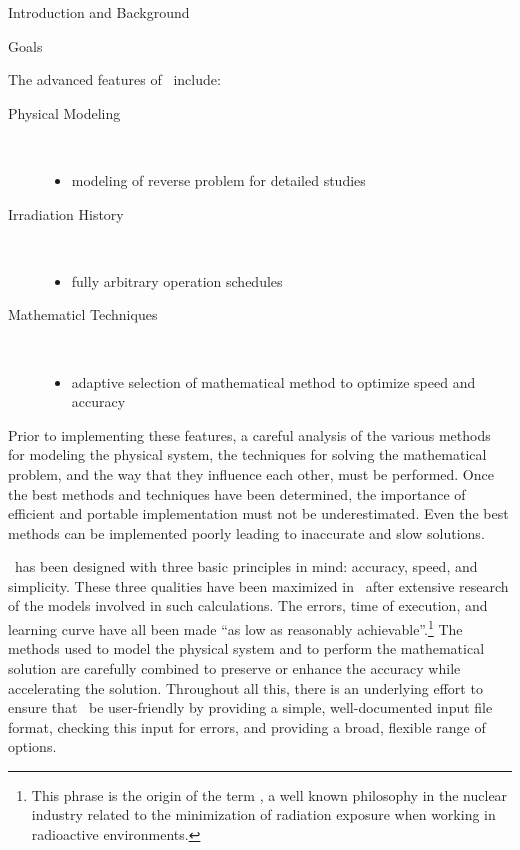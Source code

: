 \begin{chapter}{Introduction and Background}
\begin{section}{Goals}
    \vspace*{1cm}

    The advanced features of \ALARA\ include:
    \begin{description}
    \item[Physical Modeling]\ \\
      \vspace*{-1cm}
      \begin{itemize}
      \item modeling of reverse problem for detailed studies
      \end{itemize}
    \item[Irradiation History]\ \\
      \vspace*{-1cm}
      \begin{itemize}
      \item fully arbitrary operation schedules
      \end{itemize}
    \item[Mathematicl Techniques]\ \\
      \vspace*{-1cm}
      \begin{itemize}
      \item adaptive selection of mathematical method to optimize
        speed and accuracy
      \end{itemize}
    \end{description}
    
    
    Prior to implementing these features, a careful analysis of the
    various methods for modeling the physical system, the techniques
    for solving the mathematical problem, and the way that they
    influence each other, must be performed.  Once the best methods and
    techniques have been determined, the importance of efficient and
    portable implementation must not be underestimated.  Even the best
    methods can be implemented poorly leading to inaccurate and slow
    solutions.
    
    \ALARA\ has been designed with three basic principles in mind:
    accuracy, speed, and simplicity.  These three qualities have been
    maximized in \ALARA\ after extensive research of the models
    involved in such calculations.  The errors, time of execution, and
    learning curve have all been made ``as low as reasonably
    achievable''.\footnote{This phrase is the origin of the term
      \ALARA, a well known philosophy in the nuclear industry related
      to the minimization of radiation exposure when working in
      radioactive environments.}  The methods used to model the
    physical system and to perform the mathematical solution are
    carefully combined to preserve or enhance the accuracy while
    accelerating the solution.  Throughout all this, there is an
    underlying effort to ensure that \ALARA\ be user-friendly by
    providing a simple, well-documented input file format, checking
    this input for errors, and providing a broad, flexible range of
    options.
    

\end{section}
\end{chapter}
